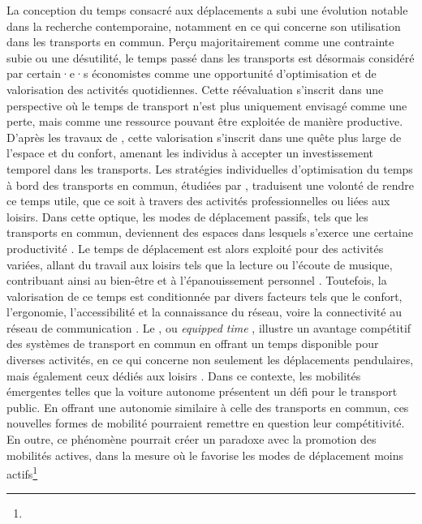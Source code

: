 \begin{refsegment}
La conception du temps consacré aux déplacements a subi une évolution notable dans la recherche contemporaine, notamment en ce qui concerne son utilisation dans les transports en commun. Perçu majoritairement comme une contrainte subie ou une désutilité, le temps passé dans les transports est désormais considéré par certain·e·s économistes comme une opportunité d'optimisation et de valorisation des activités quotidiennes. Cette réévaluation s'inscrit dans une perspective où le temps de transport n'est plus uniquement envisagé comme une perte, mais comme une ressource pouvant être exploitée de manière productive. D'après les travaux de \textcolor{blue}{\textcite[28]{joly_rapports_2003}}, cette valorisation s'inscrit dans une quête plus large de l'espace et du confort, amenant les individus à accepter un investissement temporel dans les transports. Les stratégies individuelles d'optimisation du temps à bord des transports en commun, étudiées par \textcolor{blue}{\textcite[85]{jain_gift_2008}}, traduisent une volonté de rendre ce temps utile, que ce soit à travers des activités professionnelles ou liées aux loisirs. Dans cette optique, les modes de déplacement passifs, tels que les transports en commun, deviennent des espaces dans lesquels s'exerce une certaine productivité \textcolor{blue}{\autocite[115]{lyons_use_2007}}. Le temps de déplacement est alors exploité pour des activités variées, allant du travail aux loisirs tels que la lecture ou l'écoute de musique, contribuant ainsi au bien-être et à l'épanouissement personnel \textcolor{blue}{\autocite[17]{moinse_temps_2020}}. Toutefois, la valorisation de ce temps est conditionnée par divers facteurs tels que le confort, l'ergonomie, l'accessibilité et la connaissance du réseau, voire la connectivité au réseau de communication \textcolor{blue}{\autocite[21]{bounie_what_2019}}. Le , ou \textsl{equipped time} \textcolor{blue}{\autocite[87]{jain_gift_2008}}, illustre un avantage compétitif des systèmes de transport en commun en offrant un temps disponible pour diverses activités, en ce qui concerne non seulement les déplacements pendulaires, mais également ceux dédiés aux loisirs \textcolor{blue}{\autocite[111]{lyons_use_2007}}. Dans ce contexte, les mobilités émergentes telles que la voiture autonome présentent un défi pour le transport public. En offrant une autonomie similaire à celle des transports en commun, ces nouvelles formes de mobilité pourraient remettre en question leur compétitivité. En outre, ce phénomène pourrait créer un paradoxe avec la promotion des mobilités actives, dans la mesure où le  favorise les modes de déplacement moins actifs\footnote{
}
\end{refsegment}
